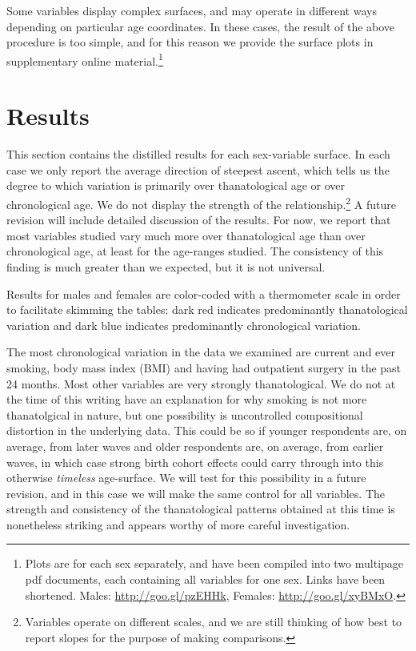 \documentclass{article}
\begin{document}
Some variables display complex surfaces, and may operate in different ways
depending on particular age coordinates. In these cases, the result of the above
procedure is too simple, and for this reason we provide the surface plots in supplementary online
material.\footnote{Plots are for each sex separately, and have been compiled
into two multipage pdf documents, each containing all variables for one sex.
Links have been shortened.
Males:
\url{http://goo.gl/pzEHHk}, Females:
\url{http://goo.gl/xyBMxO}.}



\section{Results}
This section contains the distilled results for each sex-variable surface. In
each case we only report the average direction of steepest ascent, which tells
us the degree to which variation is primarily over thanatological age or over
chronological age. We do not display the strength of the
relationship.\footnote{Variables operate on different scales, and we are still
thinking of how best to report slopes for the purpose of making comparisons. }
A future revision will include detailed discussion of the results. For now, we
report that most variables studied vary much more over thanatological age
than over chronological age, at least for the age-ranges studied. The
consistency of this finding is much greater than we expected, but it is not
universal. 

Results for males and females are color-coded with a thermometer scale in order
to facilitate skimming the tables: dark red indicates
predominantly thanatological variation and dark blue indicates
predominantly chronological variation.

The most chronological variation in the data we examined are current and ever
smoking, body mass index (BMI) and having had outpatient surgery in the past 24
months. Most other variables are very strongly thanatological. We do not at the
time of this writing have an explanation for why smoking is not more
thanatolgical in nature, but one possibility is uncontrolled compositional
distortion in the underlying data. This could be so if younger respondents are,
on average, from later waves and older respondents are, on average, from earlier
waves, in which case strong birth cohort effects could carry through into this
otherwise \textit{timeless} age-surface. We will test for this possibility in a future
revision, and in this case we will make the same control for all variables. The
strength and consistency of the thanatological patterns obtained at this time is
nonetheless striking and appears worthy of more careful
investigation.
\end{document}
